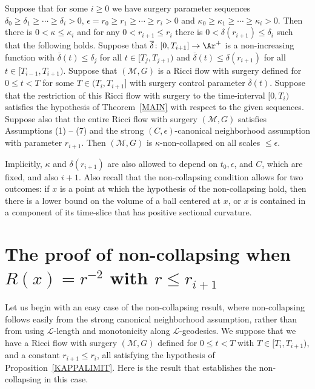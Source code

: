 \begin{proposition}
\label{prop:kappa-limit-noncollapsing}
\label{KAPPALIMIT}
Suppose that for some $i\ge 0$ we have surgery parameter sequences $\delta_0\ge
\delta_1\ge\cdots\ge \delta_i>0$, $\epsilon=r_0\ge r_1\ge \cdots\ge
r_i>0$ and $\kappa_0\ge \kappa_1\ge \cdots\ge \kappa_i>0$.
 Then there is $0<\kappa\le \kappa_i$ and for any $0<r_{i+1}\le r_i$ there is
$0<\delta(r_{i+1})\le \delta_i$ such that the following holds. Suppose that
$\overline\delta\colon [0,T_{i+1}]\to \Ar^+$ is a non-increasing function with
$\overline\delta(t)\le \delta_j$ for all $t\in [T_j,T_{j+1})$ and
$\overline\delta(t)\le \delta(r_{i+1})$ for all $t\in [T_{i-1},T_{i+1})$.
Suppose that $({\mathcal M},G)$ is a Ricci flow with surgery defined for $0\le
t<T$ for some $T\in (T_i,T_{i+1}]$ with surgery control parameter
$\overline\delta(t)$. Suppose that the restriction of this Ricci flow with
surgery  to the time-interval $[0,T_i)$ satisfies the hypothesis of
Theorem~\ref{MAIN} with respect to the given sequences. Suppose also that the
entire Ricci flow with surgery $({\mathcal M},G)$ satisfies Assumptions (1) --
(7) and the strong $(C,\epsilon)$-canonical neighborhood assumption with
parameter $r_{i+1}$. Then $({\mathcal M},G)$ is $\kappa$-non-collapsed on all
scales $\le \epsilon$.
\end{proposition}

\begin{remark}
\label{rem:kappa-delta-dependence}
Implicitly,
$\kappa$ and $\delta(r_{i+1})$ are also allowed to depend on $t_0, \epsilon$,
and $C$, which are fixed, and also $i+1$.
Also recall that the non-collapsing condition allows for two outcomes: if $x$ is a point at which the
hypothesis of the non-collapsing hold, then
there is a lower bound on the volume of a ball centered at $x$, or  $x$
is contained in a component of its time-slice that has positive sectional curvature.
\end{remark}


\section{The proof of non-collapsing when $R(x)=r^{-2}$ with
$r\le r_{i+1}$}\label{rsmall}

Let us begin with an easy case of the non-collapsing result, where
non-collapsing follows easily from the strong canonical neighborhood
assumption, rather than from using ${\mathcal L}$-length and
monotonicity along ${\mathcal L}$-geodesics. We suppose that we have
a Ricci flow with surgery $({\mathcal M},G)$ defined for $0\le t<T$
with $T\in [T_i,T_{i+1})$, and a constant $r_{i+1}\le r_i$, all
satisfying the hypothesis of Proposition~\ref{KAPPALIMIT}. Here is
the result that establishes the non-collapsing in this case.



